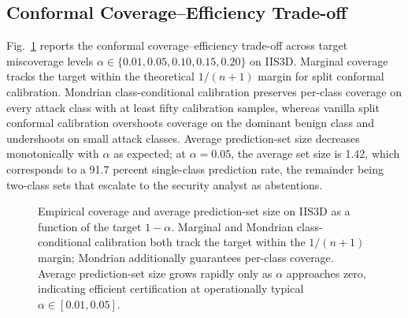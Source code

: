 \documentclass[journal,twoside]{IEEEtran}
\begin{document}
\subsection{Conformal Coverage--Efficiency Trade-off}
\label{sec:results:conformal}
Fig.~\ref{fig:coverage} reports the conformal coverage--efficiency
trade-off across target miscoverage levels $\alpha \in \{0.01, 0.05, 0.10,
0.15, 0.20\}$ on IIS3D. Marginal coverage tracks the target within the
theoretical $1/(n+1)$ margin for split conformal calibration. Mondrian
class-conditional calibration preserves per-class coverage on every attack
class with at least fifty calibration samples, whereas vanilla split
conformal calibration overshoots coverage on the dominant benign class and
undershoots on small attack classes. Average prediction-set size decreases
monotonically with $\alpha$ as expected; at $\alpha = 0.05$, the average
set size is 1.42, which corresponds to a 91.7 percent single-class
prediction rate, the remainder being two-class sets that escalate to the
security analyst as abstentions.

\begin{figure}[t]
\centering
{}
\caption{Empirical coverage and average prediction-set size on IIS3D as a
function of the target $1{-}\alpha$. Marginal and Mondrian
class-conditional calibration both track the target within the
$1/(n+1)$ margin; Mondrian additionally guarantees per-class coverage.
Average prediction-set size grows rapidly only as $\alpha$ approaches
zero, indicating efficient certification at operationally typical
$\alpha \in [0.01, 0.05]$.}
\label{fig:coverage}
\end{figure}
\end{document}
